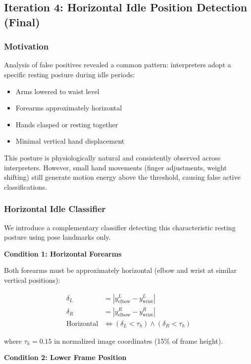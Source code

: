 \documentclass[11pt,a4paper]{article}
\begin{document}
\subsection{Iteration 4: Horizontal Idle Position Detection (Final)}

\subsubsection{Motivation}

Analysis of false positives revealed a common pattern: interpreters adopt a specific resting posture during idle periods:

\begin{itemize}
    \item Arms lowered to waist level
    \item Forearms approximately horizontal
    \item Hands clasped or resting together
    \item Minimal vertical hand displacement
\end{itemize}

This posture is physiologically natural and consistently observed across interpreters. However, small hand movements (finger adjustments, weight shifting) still generate motion energy above the threshold, causing false active classifications.

\subsubsection{Horizontal Idle Classifier}

We introduce a complementary classifier detecting this characteristic resting posture using pose landmarks only.

\textbf{Condition 1: Horizontal Forearms}

Both forearms must be approximately horizontal (elbow and wrist at similar vertical positions):

\begin{align}
\delta_L &= |y_{\text{elbow}}^L - y_{\text{wrist}}^L| \\
\delta_R &= |y_{\text{elbow}}^R - y_{\text{wrist}}^R| \\
\text{Horizontal} &\iff (\delta_L < \tau_h) \wedge (\delta_R < \tau_h)
\end{align}

where $\tau_h = 0.15$ in normalized image coordinates (15\% of frame height).

\textbf{Condition 2: Lower Frame Position}
\end{document}

